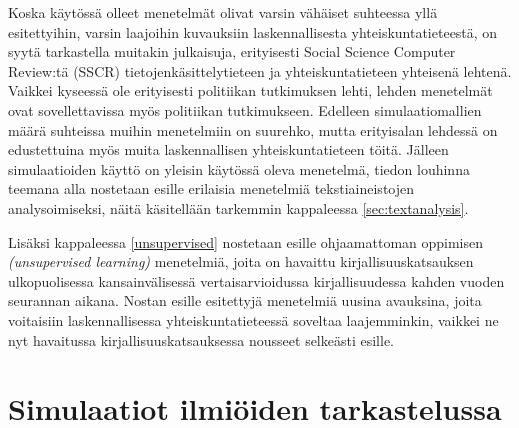 \documentclass[finnish,gradu,twoside,12pt]{tktltiki}
\begin{document}
Koska käytössä olleet menetelmät olivat varsin vähäiset suhteessa yllä esitettyihin, varsin laajoihin kuvauksiin laskennallisesta yhteiskuntatieteestä, on syytä tarkastella muitakin julkaisuja, erityisesti Social Science Computer Review:tä (SSCR) tietojenkäsittelytieteen ja yhteiskuntatieteen yhteisenä lehtenä. Vaikkei kyseessä ole erityisesti politiikan tutkimuksen lehti, lehden menetelmät ovat sovellettavissa myös politiikan tutkimukseen. Edelleen simulaatiomallien määrä suhteissa muihin menetelmiin on suurehko, mutta erityisalan lehdessä on edustettuina myös muita laskennallisen yhteiskuntatieteen töitä. Jälleen simulaatioiden käyttö on yleisin käytössä oleva menetelmä, tiedon louhinna teemana alla nostetaan esille erilaisia menetelmiä tekstiaineistojen analysoimiseksi, näitä käsitellään tarkemmin kappaleessa \ref{sec:textanalysis}.

Lisäksi kappaleessa \ref{unsupervised} nostetaan esille ohjaamattoman oppimisen \textit{(unsupervised learning)} menetelmiä, joita on havaittu kirjallisuuskatsauksen ulkopuolisessa kansainvälisessä vertaisarvioidussa kirjallisuudessa kahden vuoden seurannan aikana. Nostan esille esitettyjä menetelmiä uusina avauksina, joita voitaisiin laskennallisessa yhteiskuntatieteessä soveltaa laajemminkin, vaikkei ne nyt havaitussa kirjallisuuskatsauksessa nousseet selkeästi esille.


\section{Simulaatiot ilmiöiden tarkastelussa}
\label{simulaatio}

\end{document}
